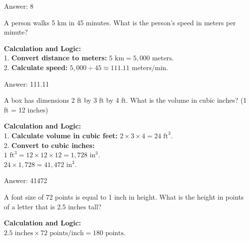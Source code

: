 \documentclass[11pt,paper=a4,answers]{exam}
\begin{document}
\begin{questions}
\begin{solution}
\vspace{30pt}

Answer: \colorbox{yellow!100}{8}
\end{solution}

\vspace{60pt}

\question
A person walks 5 km in 45 minutes. What is the person's speed in meters per minute?

\begin{solution}
\textbf{Calculation and Logic:} \\
1. \textbf{Convert distance to meters:} $5 \text{ km} = 5,000 \text{ meters}$. \\
2. \textbf{Calculate speed:} $5,000 \div 45 \approx 111.11 \text{ meters/min}$.

\vspace{30pt}

Answer: \colorbox{yellow!100}{111.11}
\end{solution}

\vspace{60pt}

\question
A box has dimensions 2 ft by 3 ft by 4 ft. What is the volume in cubic inches? (1 ft = 12 inches)

\begin{solution}
\textbf{Calculation and Logic:} \\
1. \textbf{Calculate volume in cubic feet:} $2 \times 3 \times 4 = 24 \text{ ft}^3$. \\
2. \textbf{Convert to cubic inches:} \\
$1 \text{ ft}^3 = 12 \times 12 \times 12 = 1,728 \text{ in}^3$. \\
$24 \times 1,728 = 41,472 \text{ in}^3$.

\vspace{30pt}

Answer: \colorbox{yellow!100}{41472}
\end{solution}

\vspace{60pt}

\question
A font size of 72 points is equal to 1 inch in height. What is the height in points of a letter that is 2.5 inches tall?

\begin{solution}
\textbf{Calculation and Logic:} \\
$2.5 \text{ inches} \times 72 \text{ points/inch} = 180 \text{ points}$.


\end{solution}
\end{questions}
\end{document}
